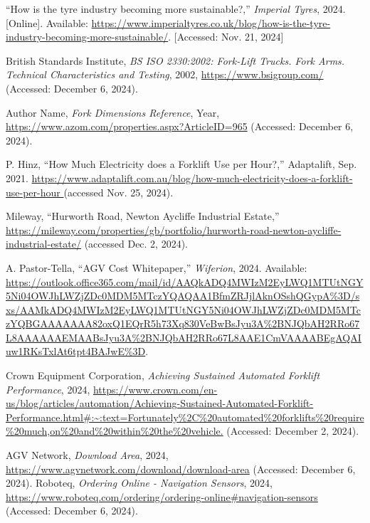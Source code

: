 \documentclass[12pt]{article}
\begin{document}
\begin{thebibliography}{99}
``How is the tyre industry becoming more sustainable?,'' \textit{Imperial Tyres}, 2024. [Online]. Available: \url{https://www.imperialtyres.co.uk/blog/how-is-the-tyre-industry-becoming-more-sustainable/}. [Accessed: Nov. 21, 2024]

British Standards Institute, \textit{BS ISO 2330:2002: Fork-Lift Trucks. Fork Arms. Technical Characteristics and Testing}, 2002, \url{https://www.bsigroup.com/} (Accessed: December 6, 2024).

Author Name, \textit{Fork Dimensions Reference}, Year, \url{https://www.azom.com/properties.aspx?ArticleID=965} (Accessed: December 6, 2024).



P. Hinz, “How Much Electricity does a Forklift Use per Hour?,” Adaptalift, Sep. 2021. \url{https://www.adaptalift.com.au/blog/how-much-electricity-does-a-forklift-use-per-hour }(accessed Nov. 25, 2024).

Mileway, “Hurworth Road, Newton Aycliffe Industrial Estate,” \url{https://mileway.com/properties/gb/portfolio/hurworth-road-newton-aycliffe-industrial-estate/} (accessed Dec. 2, 2024).
 
A. Pastor-Tella, ``AGV Cost Whitepaper,'' \textit{Wiferion}, 2024. Available: \url{https://outlook.office365.com/mail/id/AAQkADQ4MWIzM2EyLWQ1MTUtNGY5Ni04OWJhLWZjZDc0MDM5MTczYQAQAA1BfmZRJjlAknOSshQGypA%3D/sxs/AAMkADQ4MWIzM2EyLWQ1MTUtNGY5Ni04OWJhLWZjZDc0MDM5MTczYQBGAAAAAAA82oxQ1EQrR5h73Xq830VeBwBsJyu3A%2BNJQbAH2RRo67L8AAAAAAEMAABsJyu3A%2BNJQbAH2RRo67L8AAE1CmVAAAABEgAQAIuw1RKsTxlAt6tpt4BAJwE%3D}.





Crown Equipment Corporation, \textit{Achieving Sustained Automated Forklift Performance}, 2024, \url{https://www.crown.com/en-us/blog/articles/automation/Achieving-Sustained-Automated-Forklift-Performance.html#:~:text=Fortunately%2C%20automated%20forklifts%20require%20much,on%20and%20within%20the%20vehicle.} (Accessed: December 2, 2024).

AGV Network, \textit{Download Area}, 2024, \url{https://www.agvnetwork.com/download/download-area} (Accessed: December 6, 2024).
Roboteq, \textit{Ordering Online - Navigation Sensors}, 2024, \url{https://www.roboteq.com/ordering/ordering-online#navigation-sensors} (Accessed: December 6, 2024).


 

\end{thebibliography}
 
\end{document}
